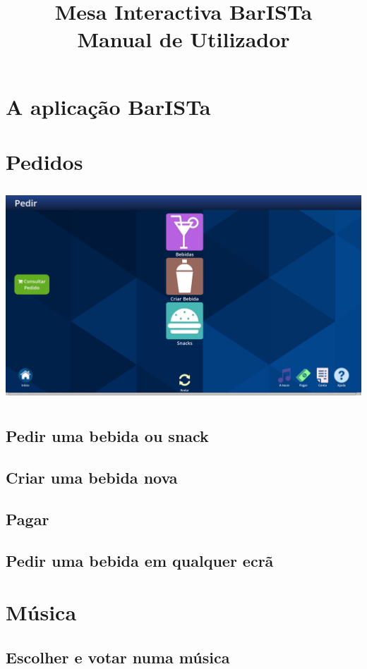 \documentclass{article}
\title{\vspace{5cm}\textbf{Mesa Interactiva BarISTa}\\Manual de Utilizador}
\begin{document}
\maketitle
\newpage

\tableofcontents
\newpage

\section{A aplicação BarISTa}
\section{Pedidos}
\includegraphics[width=15cm, height=8cm]{user_manual_images/order_menu.png}
\subsection{Pedir uma bebida ou snack}
\subsection{Criar uma bebida nova}
\subsection{Pagar}
\subsection{Pedir uma bebida em qualquer ecrã}
\section{Música}
\subsection{Escolher e votar numa música}
\end{document}
